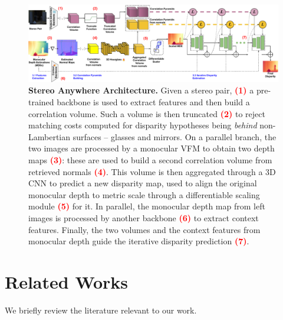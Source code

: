 \documentclass[10pt,twocolumn,letterpaper]{article}
\newcommand{\method}[0]{Stereo Anywhere\xspace}
\begin{document}
\begin{figure}[t]
    \centering
    \includegraphics[width=0.98\linewidth]{imgs/final_arch_blin_con_numerini.pdf}\vspace{-0.2cm}
    \caption{\textbf{\method Architecture.} Given a stereo pair, \textcolor{red}{\bf(1)} a pre-trained backbone is used to extract features and then build a correlation volume. Such a volume is then truncated \textcolor{red}{\bf(2)} to reject matching costs computed for disparity hypotheses being \textit{behind} non-Lambertian surfaces -- glasses and mirrors. On a parallel branch, the two images are processed by a monocular VFM to obtain two depth maps \textcolor{red}{\bf(3)}: these are used to build a second correlation volume from retrieved normals \textcolor{red}{\bf(4)}. This volume is then aggregated through a 3D CNN to predict a new disparity map, used to align the original monocular depth to metric scale through a differentiable scaling module \textcolor{red}{\bf(5)} for it. In parallel, the monocular depth map from left images is processed by another backbone \textcolor{red}{\bf(6)} to extract context features.
    Finally, the two volumes and the context features from monocular depth guide the iterative disparity prediction \textcolor{red}{\bf(7)}.}
    \label{fig:arch}
\end{figure}

\section{Related Works}
\label{sec:related}

We briefly review the literature relevant to our work.
\end{document}
